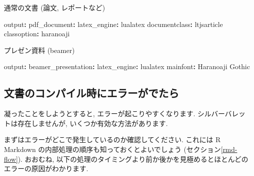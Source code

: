 \documentclass[
]{ltjsarticle}
\newenvironment{Shaded}{\begin{snugshade}}{\end{snugshade}}
\newcommand{\AttributeTok}[1]{\textcolor[rgb]{0.77,0.63,0.00}{#1}}
\newcommand{\FunctionTok}[1]{\textcolor[rgb]{0.00,0.00,0.00}{#1}}
\newcommand{\KeywordTok}[1]{\textcolor[rgb]{0.13,0.29,0.53}{\textbf{#1}}}
\begin{document}
通常の文書 (論文, レポートなど)

\begin{Shaded}
\begin{Highlighting}[]
\FunctionTok{output}\KeywordTok{:}
\AttributeTok{  }\FunctionTok{pdf\_document}\KeywordTok{:}
\AttributeTok{    }\FunctionTok{latex\_engine}\KeywordTok{:}\AttributeTok{ lualatex}
\FunctionTok{documentclass}\KeywordTok{:}\AttributeTok{ ltjsarticle}
\FunctionTok{classoption}\KeywordTok{:}\AttributeTok{ haranoaji}
\end{Highlighting}
\end{Shaded}

プレゼン資料 (beamer)

\begin{Shaded}
\begin{Highlighting}[]
\FunctionTok{output}\KeywordTok{:}
\AttributeTok{  }\FunctionTok{beamer\_presentation}\KeywordTok{:}
\AttributeTok{    }\FunctionTok{latex\_engine}\KeywordTok{:}\AttributeTok{ lualatex}
\FunctionTok{mainfont}\KeywordTok{:}\AttributeTok{ Haranoaji Gothic}
\end{Highlighting}
\end{Shaded}

\hypertarget{ux6587ux66f8ux306eux30b3ux30f3ux30d1ux30a4ux30ebux6642ux306bux30a8ux30e9ux30fcux304cux3067ux305fux3089}{%
\subsection{文書のコンパイル時にエラーがでたら}\label{ux6587ux66f8ux306eux30b3ux30f3ux30d1ux30a4ux30ebux6642ux306bux30a8ux30e9ux30fcux304cux3067ux305fux3089}}

凝ったことをしようとすると, エラーが起こりやすくなります. シルバーバレットは存在しませんが, いくつか有効な方法があります.

まずはエラーがどこで発生しているのか確認してください. これには R Markdown の内部処理の順序も知っておくとよいでしょう (セクション\ref{rmd-flow}). おおむね, 以下の処理のタイミングより前か後かを見極めるとほとんどのエラーの原因がわかります.
\end{document}
